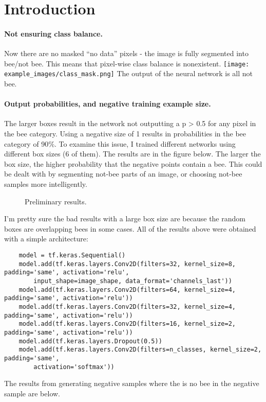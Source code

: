\documentclass[12pt]{article}
\author{
	Tommy 
}
\date{\today}
\begin{document}
\maketitle

\section{Introduction}

\paragraph{Not ensuring class balance.}
Now there are no masked ``no data'' pixels - the image is fully segmented into bee/not bee.
This means that pixel-wise class balance is nonexistent.
\texttt{[image: example\_images/class\_mask.png]}
The output of the neural network is all not bee.

\paragraph{Output probabilities, and negative training example size.}
The larger boxes result in the network not outputting a p > 0.5 for any pixel in the bee category.
Using a negative size of 1 results in probabilities in the bee category of 90$\%$. 
To examine this issue, I trained different
networks using different box sizes (6 of them). The results are in the figure below. The larger the
box size, the higher probability that the negative points contain a bee. This could be dealt with 
by segmenting not-bee parts of an image, or choosing not-bee samples more intelligently.

\begin{figure}
\centering
{}\hfill
{}\hfill
\caption{Preliminary results.}
\label{fig:test}
\end{figure}

I'm pretty sure the bad results with a large box size are because the random boxes are overlapping
bees in some cases. All of the results above were obtained with a simple architecture:
\begin{lstlisting}
    model = tf.keras.Sequential()
    model.add(tf.keras.layers.Conv2D(filters=32, kernel_size=8, padding='same', activation='relu',
        input_shape=image_shape, data_format='channels_last'))
    model.add(tf.keras.layers.Conv2D(filters=64, kernel_size=4, padding='same', activation='relu'))
    model.add(tf.keras.layers.Conv2D(filters=32, kernel_size=4, padding='same', activation='relu'))
    model.add(tf.keras.layers.Conv2D(filters=16, kernel_size=2, padding='same', activation='relu'))
    model.add(tf.keras.layers.Dropout(0.5))
    model.add(tf.keras.layers.Conv2D(filters=n_classes, kernel_size=2, padding='same',
        activation='softmax'))
\end{lstlisting}
The results from generating negative samples where the is no bee in the negative sample are below.
\end{document}
